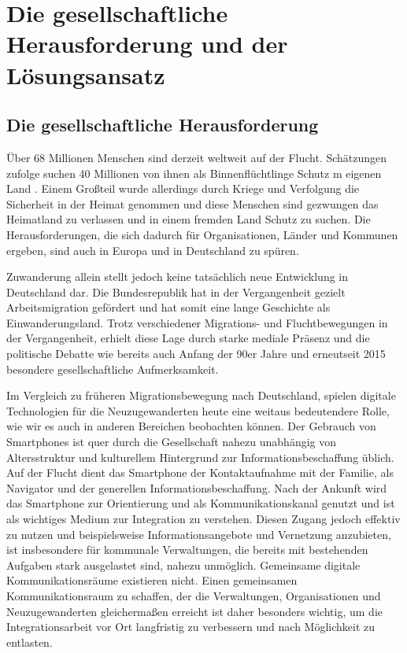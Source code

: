 \documentclass[12pt, a4paper]{article} %
\begin{document}
\hypertarget{die-gesellschaftliche-herausforderung-und-der-luxf6sungsansatz}{%
\section{Die gesellschaftliche Herausforderung und der
Lösungsansatz}\label{die-gesellschaftliche-herausforderung-und-der-luxf6sungsansatz}}

\hypertarget{die-gesellschaftliche-herausforderung}{%
\subsection{Die gesellschaftliche
Herausforderung}\label{die-gesellschaftliche-herausforderung}}

Über 68 Millionen Menschen sind derzeit weltweit auf der Flucht.
Schätzungen zufolge suchen 40 Millionen von ihnen als Binnenflüchtlinge
Schutz m eigenen Land . Einem Großteil wurde allerdings durch Kriege und
Verfolgung die Sicherheit in der Heimat genommen und diese Menschen sind
gezwungen das Heimatland zu verlassen und in einem fremden Land Schutz
zu suchen. Die Herausforderungen, die sich dadurch für Organisationen,
Länder und Kommunen ergeben, sind auch in Europa und in Deutschland zu
spüren.

Zuwanderung allein stellt jedoch keine tatsächlich neue Entwicklung in
Deutschland dar. Die Bundesrepublik hat in der Vergangenheit gezielt
Arbeitsmigration gefördert und hat somit eine lange Geschichte als
Einwanderungsland. Trotz verschiedener Migrations- und Fluchtbewegungen
in der Vergangenheit, erhielt diese Lage durch starke mediale Präsenz
und die politische Debatte wie bereits auch Anfang der 90er Jahre und
erneutseit 2015 besondere gesellschaftliche Aufmerksamkeit.

Im Vergleich zu früheren Migrationsbewegung nach Deutschland, spielen
digitale Technologien für die Neuzugewanderten heute eine weitaus
bedeutendere Rolle, wie wir es auch in anderen Bereichen beobachten
können. Der Gebrauch von Smartphones ist quer durch die Gesellschaft
nahezu unabhängig von Altersstruktur und kulturellem Hintergrund zur
Informationsbeschaffung üblich. Auf der Flucht dient das Smartphone der
Kontaktaufnahme mit der Familie, als Navigator und der generellen
Informationsbeschaffung. Nach der Ankunft wird das Smartphone zur
Orientierung und als Kommunikationskanal genutzt und ist als wichtiges
Medium zur Integration zu verstehen. Diesen Zugang jedoch effektiv zu
nutzen und beispielsweise Informationsangebote und Vernetzung
anzubieten, ist insbesondere für kommunale Verwaltungen, die bereits mit
bestehenden Aufgaben stark ausgelastet sind, nahezu unmöglich.
Gemeinsame digitale Kommunikationsräume existieren nicht. Einen
gemeinsamen Kommunikationsraum zu schaffen, der die Verwaltungen,
Organisationen und Neuzugewanderten gleichermaßen erreicht ist daher
besonders wichtig, um die Integrationsarbeit vor Ort langfristig zu
verbessern und nach Möglichkeit zu entlasten.
\end{document}
